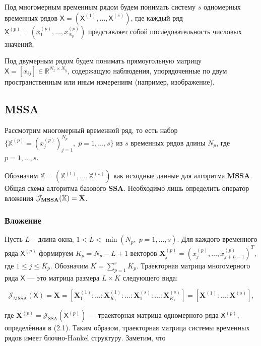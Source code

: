 \documentclass[a4paper, 11pt]{article}
\newcommand{\SSA}{\textbf{SSA}}
\newcommand{\MSSA}{\textbf{MSSA}}
\newcommand{\DSSA}{\textbf{2d-SSA}}
\newcommand{\TS}{\mathsf{X}}
\begin{document}
Под многомерным временным рядом будем понимать систему $s$ одномерных временных рядов $\TS = (\TS^{(1)}, \ldots, \TS^{(s)})$, где каждый ряд $\TS^{(p)} = (x_1^{(p)}, \ldots, x_{N_p}^{(p)})$ представляет собой последовательность числовых значений. 

Под двумерным рядом будем понимать прямоугольную матрицу $\TS = [x_{ij}] \in \mathbb{R}^{N_x \times N_y}$, содержащую наблюдения, упорядоченные по двум пространственным или иным измерениям (например, изображение).



\subsection{MSSA}

Рассмотрим многомерный временной ряд, то есть набор $\{\mathbb{X}^{(p)} = \left({x^{(p)}_{j}}\right) _{j=1}^{N_p}, \; p = 1, \ldots, s\}$ из $s$ временных рядов длины $N_p$, где $p = 1, \ldots, s$.

Обозначим $\mathbb{X} = (\mathbb{X}^{(1)}, \ldots, \mathbb{X}^{(s)})$ как исходные данные для алгоритма $\MSSA$. Общая схема алгоритма базового $\SSA$. Необходимо лишь определить оператор вложения $\mathcal{J}_{\text{\MSSA}}(\mathbb{X}) = \mathbf X$.

\subsubsection{Вложение}

Пусть $L$ -- длина окна, $1 < L < \min(N_p, \; p = 1, \ldots, s)$. Для каждого временного ряда $\TS^{(p)}$ формируем $K_p = N_p - L + 1$ векторов $\mathbf{X}_j^{(p)} = (x_j^{(p)}, \ldots, x_{j+L-1}^{(p)})^T$, где $1 \leq j \leq K_p$. Обозначим $K = \sum_{p=1}^s K_p$. Траекторная матрица многомерного ряда $\TS$ — это матрица размера $L \times K$ следующего вида:

\[
	\mathcal{J}_{\text{MSSA}}(\TS) = \mathbf{X} = [\mathbf{X}_1^{(1)} : \ldots : \mathbf{X}_{K_1}^{(1)} : \ldots : \mathbf{X}_1^{(s)} : \ldots : \mathbf{X}_{K_s}^{(s)}] = [\mathbf{X}^{(1)} : \ldots : \mathbf{X}^{(s)}],
\]

где $\mathbf{X}^{(p)} = \mathcal{J}_{\text{SSA}}(\TS^{(p)})$ — траекторная матрица одномерного ряда $\TS^{(p)}$, определённая в (2.1). Таким образом, траекторная матрица системы временных рядов имеет блочно-Hankel структуру. Заметим, что
\end{document}
